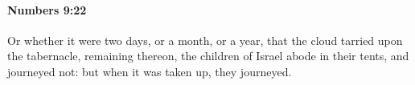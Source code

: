 
		\paragraph{Numbers 9:22} %
			\label{NUMBERS-9-22}

			Or whether it were two days, or a month, or a year, that the cloud tarried upon the tabernacle, remaining thereon, the children of Israel abode in their tents, and journeyed not: but when it was taken up, they journeyed.


